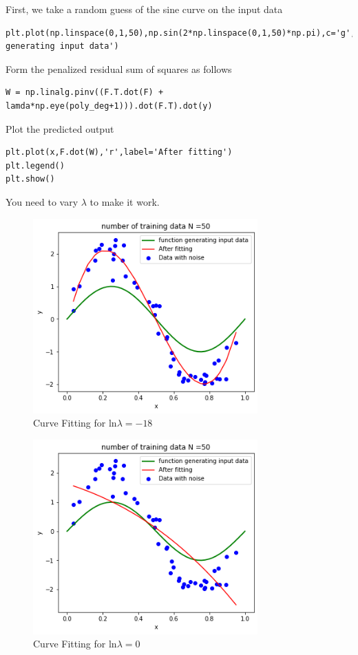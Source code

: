 \documentclass[journal,12pt,twocolumn]{IEEEtran}
\begin{document}
First, we take a random guess of the sine curve on the input data
\begin{lstlisting}
plt.plot(np.linspace(0,1,50),np.sin(2*np.linspace(0,1,50)*np.pi),c='g',linewidth=2,label='function generating input data')
\end{lstlisting} 
Form the penalized residual sum of squares as follows
\begin{lstlisting}
W = np.linalg.pinv((F.T.dot(F) + lamda*np.eye(poly_deg+1))).dot(F.T).dot(y)
\end{lstlisting}
Plot the predicted output
\begin{lstlisting}
plt.plot(x,F.dot(W),'r',label='After fitting')
plt.legend()
plt.show()
\end{lstlisting}
You need to vary $\lambda$ to make it work.
\begin{figure}[!h]
\begin{center}
\includegraphics[width=3.4in]{figs/fig2.png}
\end{center}
\caption{Curve Fitting for ln$\lambda = -18$}
\label{fig:2}
\end{figure}
\begin{figure}[!h]
\begin{center}
\includegraphics[width=3.4in]{figs/fig3.png}
\end{center}
\caption{Curve Fitting for ln$\lambda = 0$}
\label{fig:3}
\end{figure}
\end{document}
